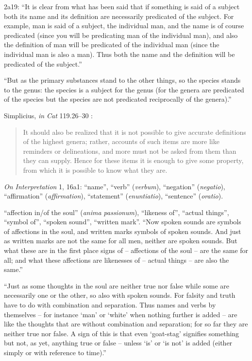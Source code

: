 \documentclass{article}
\begin{document}
2a19: ``It is clear from what has been said that if something is said of a subject both its name and its definition
are necessarily predicated of the subject. For example, man is said of a subject, the individual man, and the name
is of course predicated (since you will be predicating man
of the individual man), and also the definition of man will be predicated of the individual man (since the individual man is also
a man). Thus both the name and the definition will be predicated of the subject.'' \cite[p.~6]{ackrill}

``But as the primary substances stand to the other things, so the species stands to the genus: the species is a subject
for the genus (for the genera are predicated of the species but the species are not predicated reciprocally of the genera).''
\cite[p.~7]{ackrill}



Simplicius, {\em in Cat} 119.26--30 \cite[p.~60]{isagoge}:

\begin{quote}
It should also be realized that it is not possible to give accurate definitions of the highest genera; rather, accounts of such items are more like reminders or delineations, and more must not be asked from them than they can supply. Hence for these items it is enough to give some property, from which it is possible to know what they are.
\end{quote}

{\em On Interpretation} 1, 16a1: ``name'', ``verb'' ({\em verbum}), ``negation'' ({\em negatio}), ``affirmation'' ({\em affirmation}),
 ``statement'' ({\em enuntiatio}), ``sentence'' ({\em oratio}).
 
 ``affection 
in/of the soul'' ({\em anima passionum}),
``likeness of'', ``actual things'', ``symbol of'', ``spoken sound'', ``written mark''.
``Now spoken sounds are symbols of affections in the soul, and written marks symbols of spoken sounds. And
just as written marks are not the same for all men, neither are spoken sounds. But what these are in the first
place signs of -- affections of the soul -- are the same for all; and what these affections are likenesses of -- actual things -- 
are also the same.'' \cite[p.~43]{ackrill} 

``Just as some thoughts in the soul are neither true
nor false while some are necessarily one or the other, so
also with spoken sounds. For falsity and truth have to do
with combination and separation. Thus names and verbs
by themselves -- for instance `man' or `white' when nothing
further is added -- are like the thoughts that are without
combination and separation; for so far they are neither
true nor false. A sign of this is that even `goat-stag' signifies
something but not, as yet, anything true or false -- unless
`is' or `is not' is added (either simply or with reference to
time).'' \cite[p.~43]{ackrill}
\end{document}
